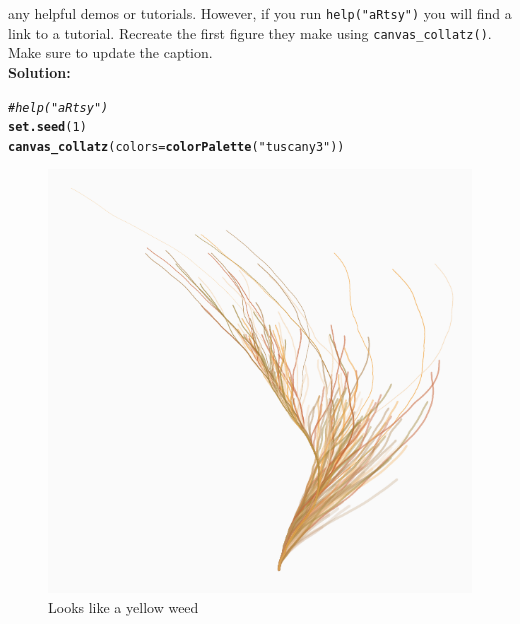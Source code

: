 \documentclass{article}\usepackage[]{graphicx}\usepackage[]{xcolor}
\makeatletter
\def\maxwidth{ %
  \ifdim\Gin@nat@width>\linewidth
    \linewidth
  \else
    \Gin@nat@width
  \fi
}
\newcommand{\hlnum}[1]{\textcolor[rgb]{0.686,0.059,0.569}{#1}}%
\newcommand{\hlsng}[1]{\textcolor[rgb]{0.192,0.494,0.8}{#1}}%
\newcommand{\hlcom}[1]{\textcolor[rgb]{0.678,0.584,0.686}{\textit{#1}}}%
\newcommand{\hldef}[1]{\textcolor[rgb]{0.345,0.345,0.345}{#1}}%
\newcommand{\hlkwc}[1]{\textcolor[rgb]{0.333,0.667,0.333}{#1}}%
\newcommand{\hlkwd}[1]{\textcolor[rgb]{0.737,0.353,0.396}{\textbf{#1}}}%
\newenvironment{kframe}{%
 \def\at@end@of@kframe{}%
 \ifinner\ifhmode%
  \def\at@end@of@kframe{\end{minipage}}%
  \begin{minipage}{\columnwidth}%
 \fi\fi%
 \def\FrameCommand##1{\hskip\@totalleftmargin \hskip-\fboxsep
 \colorbox{shadecolor}{##1}\hskip-\fboxsep
     \hskip-\linewidth \hskip-\@totalleftmargin \hskip\columnwidth}%
 \MakeFramed {\advance\hsize-\width
   \@totalleftmargin\z@ \linewidth\hsize
   \@setminipage}}%
 {\par\unskip\endMakeFramed%
 \at@end@of@kframe}
\newenvironment{knitrout}{}{} %
\makeatother
\begin{document}
\begin{enumerate}
\begin{enumerate}
 any helpful demos or tutorials. However, if you run \texttt{help("aRtsy")} you 
 will find a link to a tutorial. Recreate the first figure they make using 
 \texttt{canvas\_collatz()}. Make sure to update the caption.\\
\textbf{Solution:}
\begin{knitrout}\scriptsize
{}\color{fgcolor}\begin{kframe}
\begin{alltt}
 \hlcom{#help("aRtsy")}
 \hlkwd{set.seed}\hldef{(}\hlnum{1}\hldef{)}
 \hlkwd{canvas_collatz}\hldef{(}\hlkwc{colors} \hldef{=} \hlkwd{colorPalette}\hldef{(}\hlsng{"tuscany3"}\hldef{))}
\end{alltt}
\end{kframe}
\end{knitrout}
\begin{figure}[H]
\begin{center}
\begin{knitrout}
\color{fgcolor}
\includegraphics[width=\maxwidth]{figure/unnamed-chunk-3-1} 
\end{knitrout}
\caption{Looks like a yellow weed}
\label{CollatzPlot1}
\end{center}
\end{figure}

\end{enumerate}
\end{enumerate}
\end{document}
